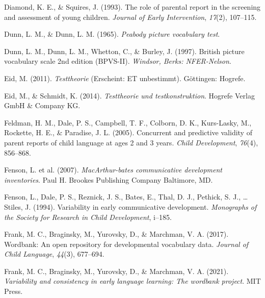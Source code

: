 \documentclass[
  man,floatsintext]{apa6}
\newlength{\cslhangindent}
\newlength{\cslentryspacingunit} %
\newenvironment{CSLReferences}[2] %
 {%
  \setlength{\parindent}{0pt}
  \ifodd #1
  \let\oldpar\par
  \def\par{\hangindent=\cslhangindent\oldpar}
  \fi
  \setlength{\parskip}{#2\cslentryspacingunit}
 }%
 {}
\begin{document}
\begin{CSLReferences}{1}{0}
\leavevmode{}%
Diamond, K. E., \& Squires, J. (1993). The role of parental report in the screening and assessment of young children. \emph{Journal of Early Intervention}, \emph{17}(2), 107--115.

\leavevmode{}%
Dunn, L. M., \& Dunn, L. M. (1965). \emph{Peabody picture vocabulary test}.

\leavevmode{}%
Dunn, L. M., Dunn, L. M., Whetton, C., \& Burley, J. (1997). British picture vocabulary scale 2nd edition (BPVS-II). \emph{Windsor, Berks: NFER-Nelson}.

\leavevmode{}%
Eid, M. (2011). \emph{Testtheorie} (Erscheint: ET unbestimmt). Göttingen: Hogrefe.

\leavevmode{}%
Eid, M., \& Schmidt, K. (2014). \emph{Testtheorie und testkonstruktion}. Hogrefe Verlag GmbH \& Company KG.

\leavevmode{}%
Feldman, H. M., Dale, P. S., Campbell, T. F., Colborn, D. K., Kurs-Lasky, M., Rockette, H. E., \& Paradise, J. L. (2005). Concurrent and predictive validity of parent reports of child language at ages 2 and 3 years. \emph{Child Development}, \emph{76}(4), 856--868.

\leavevmode{}%
Fenson, L. et al. (2007). \emph{MacArthur-bates communicative development inventories}. Paul H. Brookes Publishing Company Baltimore, MD.

\leavevmode{}%
Fenson, L., Dale, P. S., Reznick, J. S., Bates, E., Thal, D. J., Pethick, S. J., \ldots{} Stiles, J. (1994). Variability in early communicative development. \emph{Monographs of the Society for Research in Child Development}, i--185.

\leavevmode{}%
Frank, M. C., Braginsky, M., Yurovsky, D., \& Marchman, V. A. (2017). Wordbank: An open repository for developmental vocabulary data. \emph{Journal of Child Language}, \emph{44}(3), 677--694.

\leavevmode{}%
Frank, M. C., Braginsky, M., Yurovsky, D., \& Marchman, V. A. (2021). \emph{Variability and consistency in early language learning: The wordbank project}. MIT Press.


\end{CSLReferences}
\end{document}
